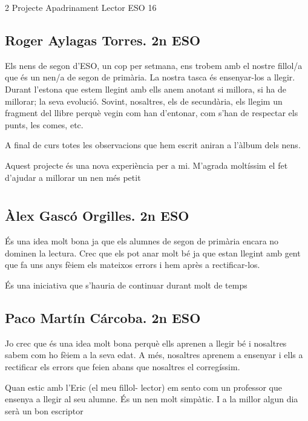\begin{news}
{2} %
{Projecte Apadrinament Lector}
{}
{ESO}
{16} %

\subsection*{
Roger Aylagas Torres. 2n ESO}

 Els nens de segon d'ESO, un cop per setmana, ens trobem amb el nostre fillol/a que és un nen/a de segon de primària. La nostra tasca és ensenyar-los a llegir. Durant l'estona que estem llegint amb ells anem anotant  si millora, si ha de millorar; la seva evolució. Sovint, nosaltres, els de secundària, els llegim un fragment del llibre perquè vegin com han d'entonar, com s'han de respectar els punts, les comes, etc. 

A final de curs totes les observacions que hem escrit aniran a l'àlbum dels nens.

{ Aquest projecte és una nova experiència per a mi. M'agrada moltíssim el fet d'ajudar a millorar un nen més petit}


\section*{}

\subsection*{
Àlex Gascó Orgilles. 2n ESO}

 És una idea molt bona ja que els alumnes de segon de primària encara no dominen la lectura. Crec que els pot anar molt bé ja que estan llegint amb gent que fa uns anys fèiem els mateixos errors i hem après a rectificar-los.

{És una iniciativa que s'hauria de continuar durant molt de temps}


\subsection*
{Paco Martín Cárcoba. 2n ESO }

 Jo crec que és una idea molt bona perquè ells aprenen a llegir bé i nosaltres sabem com ho fèiem a la seva edat. A més, nosaltres aprenem a ensenyar i ells a rectificar els errors que feien abans que nosaltres el corregíssim.

{Quan estic amb l'Eric (el meu fillol- lector) em sento com un professor que ensenya a llegir al seu alumne. És un nen molt simpàtic. I a la millor algun dia serà un bon escriptor}

\end{news}
